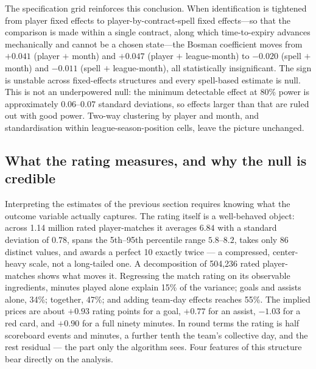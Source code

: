 \documentclass{article}
\begin{document}
The specification grid reinforces this conclusion. When identification is
tightened from player fixed effects to player-by-contract-spell fixed
effects---so that the comparison is made within a single contract, along which
time-to-expiry advances mechanically and cannot be a chosen state---the Bosman
coefficient moves from $+0.041$ (player $+$ month) and $+0.047$ (player $+$
league-month) to $-0.020$ (spell $+$ month) and $-0.011$ (spell $+$
league-month), all statistically insignificant. The sign is unstable across
fixed-effects structures and every spell-based estimate is null. This is not an
underpowered null: the minimum detectable effect at 80\% power is approximately
0.06--0.07 standard deviations, so effects larger than that are ruled out with
good power. Two-way clustering by player and month, and standardisation within
league-season-position cells, leave the picture unchanged. \\

\subsection{What the rating measures, and why the null is credible}
\label{sec:results-anatomy}

Interpreting the estimates of the previous section requires knowing what the
outcome variable actually captures. The rating itself is a well-behaved
object: across 1.14 million rated player-matches it averages $6.84$ with a
standard deviation of $0.78$, spans the 5th--95th percentile range
$5.8$--$8.2$, takes only 86 distinct values, and awards a perfect 10 exactly
twice --- a compressed, center-heavy scale, not a long-tailed one. A
decomposition of 504{,}236 rated player-matches shows what moves it.
Regressing the match rating on its observable ingredients, minutes played
alone explain 15\% of the variance; goals and assists alone, 34\%; together,
47\%; and adding team-day effects reaches 55\%. The implied prices are about
$+0.93$ rating points for a goal, $+0.77$ for an assist, $-1.03$ for a red
card, and $+0.90$ for a full ninety minutes. In round terms the rating is
half scoreboard events and minutes, a further tenth the team's collective
day, and the rest residual --- the part only the algorithm sees. Four
features of this structure bear directly on the analysis. \\
\end{document}
